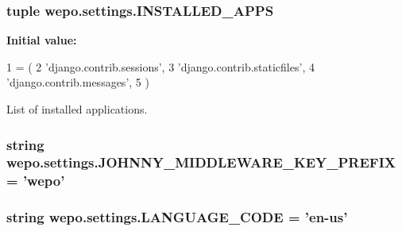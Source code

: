 \hypertarget{namespacewepo_1_1settings_afe5c150c28fa0af812216ed9dfc613fe}{
\subsubsection[{I\-N\-S\-T\-A\-L\-L\-E\-D\-\_\-\-A\-P\-P\-S}]{\setlength{\rightskip}{0pt plus 5cm}tuple wepo.\-settings.\-I\-N\-S\-T\-A\-L\-L\-E\-D\-\_\-\-A\-P\-P\-S}}\label{namespacewepo_1_1settings_afe5c150c28fa0af812216ed9dfc613fe}
{\bfseries Initial value\-:}
\begin{DoxyCode}
1 = (
2    \textcolor{stringliteral}{'django.contrib.sessions'},
3    \textcolor{stringliteral}{'django.contrib.staticfiles'},
4    \textcolor{stringliteral}{'django.contrib.messages'},
5 )
\end{DoxyCode}


List of installed applications. 

\hypertarget{namespacewepo_1_1settings_a7c38ded18bd50ffa02f5cb2d6f3e2cee}{
\subsubsection[{J\-O\-H\-N\-N\-Y\-\_\-\-M\-I\-D\-D\-L\-E\-W\-A\-R\-E\-\_\-\-K\-E\-Y\-\_\-\-P\-R\-E\-F\-I\-X}]{\setlength{\rightskip}{0pt plus 5cm}string wepo.\-settings.\-J\-O\-H\-N\-N\-Y\-\_\-\-M\-I\-D\-D\-L\-E\-W\-A\-R\-E\-\_\-\-K\-E\-Y\-\_\-\-P\-R\-E\-F\-I\-X = 'wepo'}}\label{namespacewepo_1_1settings_a7c38ded18bd50ffa02f5cb2d6f3e2cee}
\hypertarget{namespacewepo_1_1settings_a770ad9d20008a67ec0b4bdb522011c44}{
\subsubsection[{L\-A\-N\-G\-U\-A\-G\-E\-\_\-\-C\-O\-D\-E}]{\setlength{\rightskip}{0pt plus 5cm}string wepo.\-settings.\-L\-A\-N\-G\-U\-A\-G\-E\-\_\-\-C\-O\-D\-E = 'en-\/us'}}\label{namespacewepo_1_1settings_a770ad9d20008a67ec0b4bdb522011c44}


